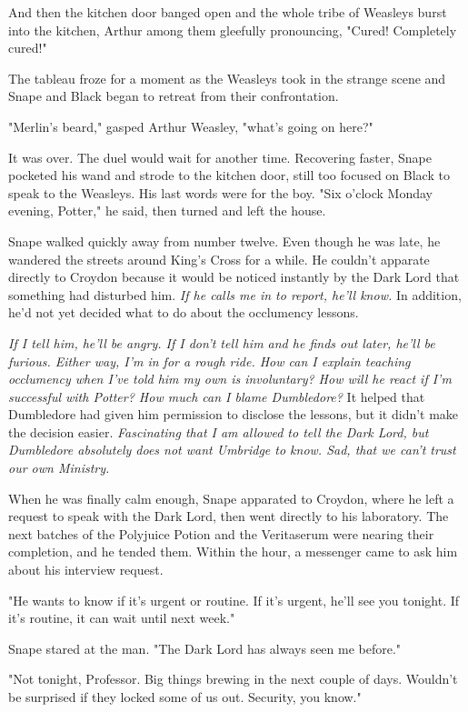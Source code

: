 \documentclass[a4paper,11pt]{article}
\begin{document}
And then the kitchen door banged open and the whole tribe of Weasleys burst into the kitchen, Arthur among them gleefully pronouncing, "Cured! Completely cured!"

The tableau froze for a moment as the Weasleys took in the strange scene and Snape and Black began to retreat from their confrontation.

"Merlin's beard," gasped Arthur Weasley, "what's going on here?"

It was over. The duel would wait for another time. Recovering faster, Snape pocketed his wand and strode to the kitchen door, still too focused on Black to speak to the Weasleys. His last words were for the boy. "Six o'clock Monday evening, Potter," he said, then turned and left the house.

Snape walked quickly away from number twelve. Even though he was late, he wandered the streets around King's Cross for a while. He couldn't apparate directly to Croydon because it would be noticed instantly by the Dark Lord that something had disturbed him. \emph{If he calls me in to report, he'll know.} In addition, he'd not yet decided what to do about the occlumency lessons.

\emph{If I tell him, he'll be angry. If I don't tell him and he finds out later, he'll be furious. Either way, I'm in for a rough ride. How can I explain teaching occlumency when I've told him my own is involuntary? How will he react if I'm successful with Potter? How much can I blame Dumbledore?} It helped that Dumbledore had given him permission to disclose the lessons, but it didn't make the decision easier. \emph{Fascinating that I am allowed to tell the Dark Lord, but Dumbledore absolutely does not want Umbridge to know. Sad, that we can't trust our own Ministry.}

When he was finally calm enough, Snape apparated to Croydon, where he left a request to speak with the Dark Lord, then went directly to his laboratory. The next batches of the Polyjuice Potion and the Veritaserum were nearing their completion, and he tended them. Within the hour, a messenger came to ask him about his interview request.

"He wants to know if it's urgent or routine. If it's urgent, he'll see you tonight. If it's routine, it can wait until next week."

Snape stared at the man. "The Dark Lord has always seen me before."

"Not tonight, Professor. Big things brewing in the next couple of days. Wouldn't be surprised if they locked some of us out. Security, you know."
\end{document}
